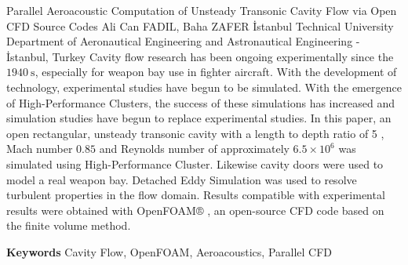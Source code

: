 
    \begin{abstract_online}{Parallel Aeroacoustic Computation of Unsteady Transonic Cavity Flow via Open CFD Source Codes}{%
        Ali Can FADIL, Baha ZAFER}{%
        }{%
        İstanbul Technical University Department of Aeronautical Engineering and Astronautical Engineering - İstanbul, Turkey}
    Cavity flow research has been ongoing experimentally since the $1940 \mathrm{~s}$, especially for weapon bay use in fighter aircraft. With the development of technology, experimental studies have begun to be simulated. With the emergence of High-Performance Clusters, the success of these simulations has increased and simulation studies have begun to replace experimental studies. In this paper, an open rectangular, unsteady transonic cavity with a length to depth ratio of 5 , Mach number $0.85$ and Reynolds number of approximately $6.5 \times 10^{6}$ was simulated using High-Performance Cluster. Likewise cavity doors were used to model a real weapon bay. Detached Eddy Simulation was used to resolve turbulent properties in the flow domain. Results compatible with experimental results were obtained with OpenFOAM® , an open-source CFD code based on the finite volume method. 
    
        \textbf{Keywords} \newline{}Cavity Flow, OpenFOAM, Aeroacoustics, Parallel CFD
    \end{abstract_online}
    